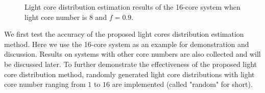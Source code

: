\begin{figure}
\qquad
\caption{Light core distribution estimation results of the 16-core system when light core number is $8$ and $f = 0.9$.}
\label{fig:map}
\end{figure}


We first test the accuracy of the proposed light cores distribution estimation method. Here we use the 16-core system as an example for demonstration and discussion. Results on systems with other core numbers are also collected and will be discussed later. To further demonstrate the effectiveness of the proposed light core distribution method, randomly generated light core distributions with light core number ranging from $1$ to $16$ are implemented (called "random" for short).

